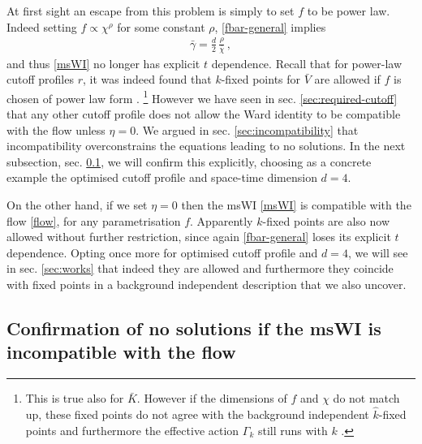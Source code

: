 \documentclass[11pt,draft]{book} %
\newcommand{\bc}{\bar \chi}
\newcommand{\bV}{\bar V}
\newcommand{\bg}{\bar \gamma}
\begin{document}
At first sight an escape from this problem is simply to set $f$ to be power law.
Indeed setting $f\propto\chi^{\rho}$ for some constant $\rho$, \eqref{fbar-general} implies
\begin{align}
  \bg = \frac{d}{2} \, \frac{\rho}{\bc}\,,
  \label{powlaw-gamma}
\end{align}
and thus \eqref{msWI} no longer has explicit $t$ dependence.
Recall that for power-law cutoff profiles $r$, it was indeed found that $k$-fixed points for $\bV$
are allowed if $f$ is chosen of power law form \cite{Dietz:2015owa}.%
\footnote{This is true also for $\bar{K}$. However if the dimensions of $f$ and $\chi$ do not match up,
  these fixed points do not agree with the background independent $\hat{k}$-fixed points and furthermore
the effective action $\Gamma_k$ still runs with $k$ \cite{Dietz:2015owa}.}
However we have seen in sec. \ref{sec:required-cutoff} that any other cutoff profile does
not allow the Ward identity to be compatible with the flow unless $\eta=0$.
We argued in sec. \ref{sec:incompatibility} that incompatibility overconstrains the equations
leading to no solutions. In the next subsection, sec. \ref{sec:incompatible-no-solns},
we will confirm this explicitly, choosing as a concrete example the optimised cutoff profile and
space-time dimension $d=4$.

On the other hand, if we set $\eta=0$ then the msWI \eqref{msWI} is compatible with the flow \eqref{flow},
for any parametrisation $f$. Apparently $k$-fixed points are also now allowed without further restriction,
since again \eqref{fbar-general} loses its explicit $t$ dependence.
Opting once more for optimised cutoff profile and $d=4$, we will see in sec. \ref{sec:works} that
indeed they are allowed and furthermore they coincide with fixed points in a background independent
description that we also uncover.


\subsection{Confirmation of no solutions if the msWI is incompatible with the flow}
\label{sec:incompatible-no-solns}
\end{document}
